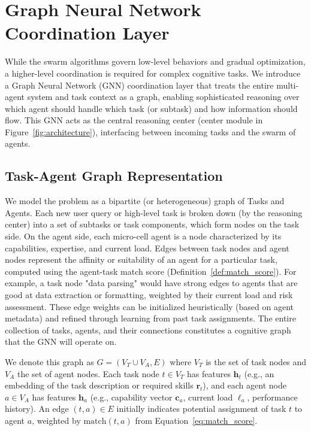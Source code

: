\documentclass{article}
\begin{document}
\section{Graph Neural Network Coordination Layer}
\label{sec:gnn_coordination}

While the swarm algorithms govern low-level behaviors and gradual optimization, a higher-level coordination is required for complex cognitive tasks. We introduce a Graph Neural Network (GNN) coordination layer that treats the entire multi-agent system and task context as a graph, enabling sophisticated reasoning over which agent should handle which task (or subtask) and how information should flow. This GNN acts as the central reasoning center (center module in Figure~\ref{fig:architecture}), interfacing between incoming tasks and the swarm of agents.

\subsection{Task-Agent Graph Representation}

We model the problem as a bipartite (or heterogeneous) graph of Tasks and Agents. Each new user query or high-level task is broken down (by the reasoning center) into a set of subtasks or task components, which form nodes on the task side. On the agent side, each micro-cell agent is a node characterized by its capabilities, expertise, and current load. Edges between task nodes and agent nodes represent the affinity or suitability of an agent for a particular task, computed using the agent-task match score (Definition~\ref{def:match_score}). For example, a task node "data parsing" would have strong edges to agents that are good at data extraction or formatting, weighted by their current load and risk assessment. These edge weights can be initialized heuristically (based on agent metadata) and refined through learning from past task assignments. The entire collection of tasks, agents, and their connections constitutes a cognitive graph that the GNN will operate on.

We denote this graph as $G = (V_T \cup V_A, E)$ where $V_T$ is the set of task nodes and $V_A$ the set of agent nodes. Each task node $t \in V_T$ has features $\mathbf{h}_t$ (e.g., an embedding of the task description or required skills $\mathbf{r}_t$), and each agent node $a \in V_A$ has features $\mathbf{h}_a$ (e.g., capability vector $\mathbf{c}_a$, current load $\ell_a$, performance history). An edge $(t,a) \in E$ initially indicates potential assignment of task $t$ to agent $a$, weighted by $\text{match}(t,a)$ from Equation~\ref{eq:match_score}.
\end{document}
